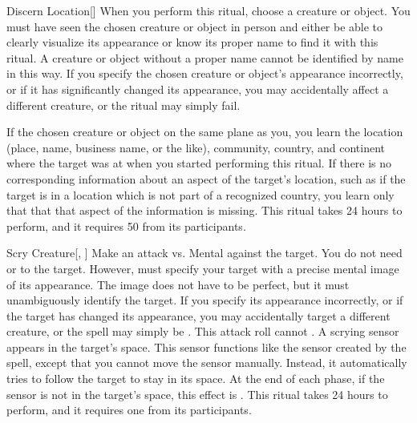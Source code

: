 \lowercase{\hypertarget{spell:Discern Location}{}}\label{spell:Discern Location}
\begin{freeability}[Rank 5]{\hypertarget{spell:Discern Location}{Discern Location}}[]
\targetrule
When you perform this ritual, choose a creature or object.
You must have seen the chosen creature or object in person and either be able to clearly visualize its appearance or know its proper name to find it with this ritual.
A creature or object without a proper name cannot be identified by name in this way.
If you specify the chosen creature or object's appearance incorrectly, or if it has significantly changed its appearance, you may accidentally affect a different creature, or the ritual may simply fail.

If the chosen creature or object on the same plane as you, you learn the location (place, name, business name, or the like), community, country, and continent where the target was at when you started performing this ritual.
If there is no corresponding information about an aspect of the target's location, such as if the target is in a location which is not part of a recognized country,
you learn only that that that aspect of the information is missing.
This ritual takes 24 hours to perform, and it requires 50  from its participants.
\end{freeability}
\vspace{0.25em}



\lowercase{\hypertarget{spell:Scry Creature}{}}\label{spell:Scry Creature}
\begin{freeability}[Rank 5]{\hypertarget{spell:Scry Creature}{Scry Creature}}[, ]
Make an attack vs. Mental against the target.
You do not need  or  to the target.
However,  must specify your target with a precise mental image of its appearance.
The image does not have to be perfect, but it must unambiguously identify the target.
If you specify its appearance incorrectly, or if the target has changed its appearance, you may accidentally target a different creature, or the spell may simply be .
This attack roll cannot .
\hit A scrying sensor appears in the target's space.
This sensor functions like the sensor created by the  spell, except that you cannot move the sensor manually.
Instead, it automatically tries to follow the target to stay in its space.
At the end of each phase, if the sensor is not in the target's space, this effect is .
This ritual takes 24 hours to perform, and it requires one  from its participants.
\end{freeability}
\vspace{0.25em}



